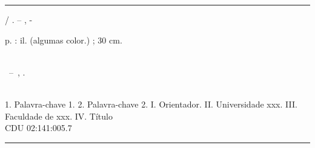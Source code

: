 
%
%     
\begin{catalographiccard}
	\vspace*{\fill}					%
	\hrule							%
	\begin{center}					%
	\begin{minipage}[c]{12.5cm}		%

	\printauthor

	\hspace{0.5cm} \printtitle  / \printauthor. --
	\printlocal, \printdate-

	\hspace{0.5cm} \pageref{LastPage} p. : il. (algumas color.) ; 30 cm.\\

	\hspace{0.5cm} \printadvisorLabel~\printadvisor\\

	\hspace{0.5cm}
	\parbox[t]{\textwidth}{\printtypeofdocument~--~\printinstitution,
	\printdate.}\\

	\hspace{0.5cm}
		1. Palavra-chave 1.
		2. Palavra-chave 2.
		I. Orientador.
		II. Universidade xxx.
		III. Faculdade de xxx.
		IV. Título\\

	\hspace{8.75cm} CDU 02:141:005.7\\

	\end{minipage}
	\end{center}
	\hrule
\end{catalographiccard}
